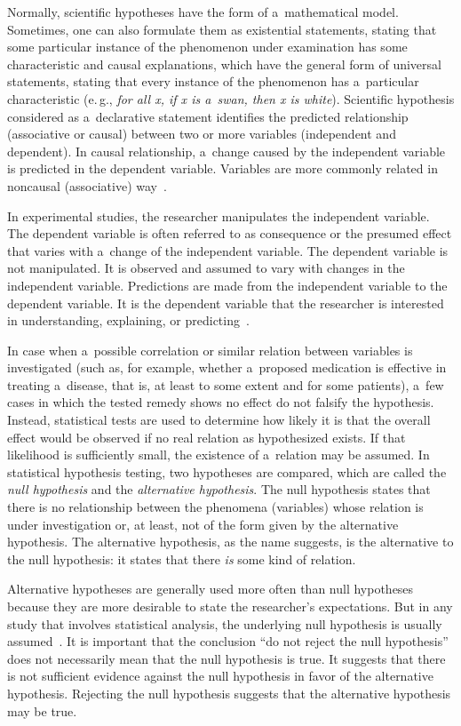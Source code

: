 \begin{multicols}{2}
  \noindent
  Normally, scientific hypotheses have the form of a~mathematical model.
Sometimes, one can also formulate them as existential statements, stating that some
particular instance of the phenomenon under examination has some characteristic and
causal explanations, which have the general form of universal statements, stating that
every instance of the phenomenon has a~particular characteristic (e.\,g., \textit{for all
x, if x is a~swan, then x is white}). Scientific hypothesis considered as a~declarative
statement identifies the predicted relationship (associative or causal) between two or
more variables (independent and dependent).  In causal relationship, a~change caused
by the independent variable is predicted in the dependent variable. Variables are more
commonly related in noncausal (associative) way~\cite{7-kl}.

  In experimental studies, the researcher manipulates the independent variable. The
dependent variable is often referred to as consequence or the presumed effect that
varies with a~change of the independent variable. The dependent variable is not
manipulated. It is observed and assumed to vary with changes in the independent
variable. Predictions are made from the independent variable to the dependent
variable. It is the dependent variable that the researcher is interested in understanding,
explaining, or predicting~\cite{7-kl}.

  In case when a~possible correlation or similar relation between variables is
investigated (such as, for example, whether a~proposed medication is effective in treating a~disease, that is, at least to some extent and for some patients), a~few cases in which
the tested remedy shows no effect do not falsify the hypothesis. Instead, statistical
tests are used to determine how likely it is that the overall effect would be observed if
no real relation as hypothesized exists. If that likelihood is sufficiently small, the
existence of a~relation may be assumed. In statistical hypothesis testing, two
hypotheses are compared, which are called the \textit{null hypothesis} and the
\textit{alternative hypothesis}. The null hypothesis states that there is no relationship
between the phenomena (variables) whose relation is under investigation or, at least,
not of the form given by the alternative hypothesis. The alternative hypothesis, as the
name suggests, is the alternative to the null hypothesis: it states that there \textit{is}
some kind of relation.

  Alternative hypotheses are generally used more often than null hypotheses because
they are more desirable to state the researcher's expectations. But in any study that
involves statistical analysis, the underlying null hypothesis is usually
assumed~\cite{7-kl}. It is important that the conclusion ``do not reject the null
hypothesis'' does not necessarily mean that the null hypothesis is true. It suggests that
there is not sufficient evidence against the null hypothesis in favor of the alternative
hypothesis.  Rejecting the null hypothesis suggests that the alternative hypothesis
may be true.


\end{multicols}
